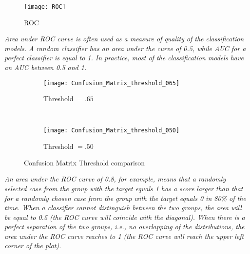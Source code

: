 \begin{figure}[H]
	\texttt{[image: ROC]}
	\caption[ROC]
	{ROC}
	\label{fig:ROC}
\end{figure}

\textit{Area under ROC curve is often used as a measure of quality of the classification models. A random classifier has an area under the curve of 0.5, while AUC for a perfect classifier is equal to 1. In practice, most of the classification models have an AUC between 0.5 and 1.}

\begin{figure}[H]
	\centering
	\begin{subfigure}[b]{0.45\textwidth}
		\captionsetup{font=scriptsize}
		\texttt{[image: Confusion\_Matrix\_threshold\_065]}
		\caption{Threshold $=.65$}\label{fig:Threshold65}
	\end{subfigure} ~\quad
	\begin{subfigure}[b]{0.45\textwidth}
		\captionsetup{font=scriptsize}
		\texttt{[image: Confusion\_Matrix\_threshold\_050]}
		\caption{Threshold $=.50$}\label{fig:Threshold50}
	\end{subfigure}
	\caption{Confusion Matrix Threshold comparison}
	\label{fig:matric_compare}
\end{figure}

\textit{An area under the ROC curve of 0.8, for example, means that a randomly selected case from the group with the target equals 1 has a score larger than that for a randomly chosen case from the group with the target equals 0 in 80\% of the time. When a classifier cannot distinguish between the two groups, the area will be equal to 0.5 (the ROC curve will coincide with the diagonal). When there is a perfect separation of the two groups, i.e., no overlapping of the distributions, the area under the ROC curve reaches to 1 (the ROC curve will reach the upper left corner of the plot).}

